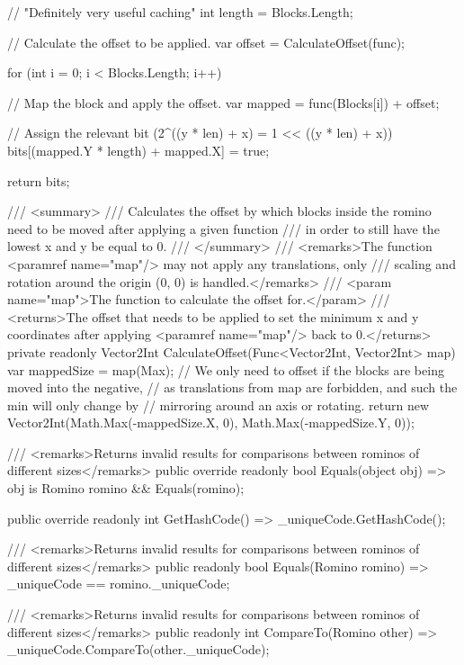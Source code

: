 \documentclass[a4paper,10pt,ngerman]{scrartcl}
\begin{document}
\begin{lstcs}
{{        // "Definitely very useful caching"
        int length = Blocks.Length;

        // Calculate the offset to be applied.
        var offset = CalculateOffset(func);

        for (int i = 0; i < Blocks.Length; i++)
        {
            // Map the block and apply the offset.
            var mapped = func(Blocks[i]) + offset;

            // Assign the relevant bit (2^((y * len) + x) = 1 << ((y * len) + x))
            bits[(mapped.Y * length) + mapped.X] = true;
        }

        return bits;
    }

    /// <summary>
    /// Calculates the offset by which blocks inside the romino need to be moved after applying a given function
    /// in order to still have the lowest x and y be equal to 0.
    /// </summary>
    /// <remarks>The function <paramref name="map"/> may not apply any translations, only 
    /// scaling and rotation around the origin (0, 0) is handled.</remarks>
    /// <param name="map">The function to calculate the offset for.</param>
    /// <returns>The offset that needs to be applied to set the minimum x and y coordinates after applying <paramref name="map"/> back to 0.</returns>
    private readonly Vector2Int CalculateOffset(Func<Vector2Int, Vector2Int> map)
    {
        var mappedSize = map(Max);
        // We only need to offset if the blocks are being moved into the negative,
        // as translations from map are forbidden, and such the min will only change by
        // mirroring around an axis or rotating.
        return new Vector2Int(Math.Max(-mappedSize.X, 0), Math.Max(-mappedSize.Y, 0));
    }

    /// <remarks>Returns invalid results for comparisons between rominos of different sizes</remarks>
    public override readonly bool Equals(object obj) => obj is Romino romino && Equals(romino);

    public override readonly int GetHashCode() => _uniqueCode.GetHashCode();

    /// <remarks>Returns invalid results for comparisons between rominos of different sizes</remarks>
    public readonly bool Equals(Romino romino) => _uniqueCode == romino._uniqueCode;

    /// <remarks>Returns invalid results for comparisons between rominos of different sizes</remarks>
    public readonly int CompareTo(Romino other) => _uniqueCode.CompareTo(other._uniqueCode);
}
\end{lstcs}
\end{document}
